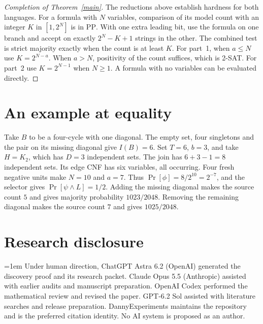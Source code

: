 \documentclass[11pt,a4paper]{amsart}
\newcommand{\PP}{\mathrm{PP}}
\begin{document}
\begin{proof}[Completion of Theorem~\ref{main}]
The reductions above establish hardness for both languages. For a formula with \(N\) variables, comparison of its model count with an integer \(K\) in \([1,2^N]\) is in \(\PP\). With one extra leading bit, use the formula on one branch and accept on exactly \(2^N-K+1\) strings in the other. The combined test is strict majority exactly when the count is at least \(K\). For part~1, when \(a\le N\) use \(K=2^{N-a}\). When \(a>N\), positivity of the count suffices, which is 2-SAT. For part~2 use \(K=2^{N-1}\) when \(N\ge1\). A formula with no variables can be evaluated directly.
\end{proof}

\section{An example at equality}

Take \(B\) to be a four-cycle with one diagonal. The empty set, four singletons and the pair on its missing diagonal give \(I(B)=6\). Set \(T=6\), \(b=3\), and take \(H=K_2\), which has \(D=3\) independent sets. The join has \(6+3-1=8\) independent sets. Its edge CNF has six variables, all occurring. Four fresh negative units make \(N=10\) and \(a=7\). Thus \(\Pr[\phi]=8/2^{10}=2^{-7}\), and the selector gives \(\Pr[\psi\wedge L]=1/2\). Adding the missing diagonal makes the source count \(5\) and gives majority probability \(1023/2048\). Removing the remaining diagonal makes the source count \(7\) and gives \(1025/2048\).

\section*{Research disclosure}

\begingroup{}\emergencystretch=1em\relax
Under human direction, ChatGPT Astra 6.2 (OpenAI) generated the discovery proof and its research packet. Claude Opus 5.5 (Anthropic) assisted with earlier audits and manuscript preparation. OpenAI Codex performed the mathematical review and revised the paper. GPT-6.2 Sol assisted with literature searches and release preparation. DannyExperiments maintains the repository and is the preferred citation identity. No AI system is proposed as an author.
\par\endgroup
\end{document}
